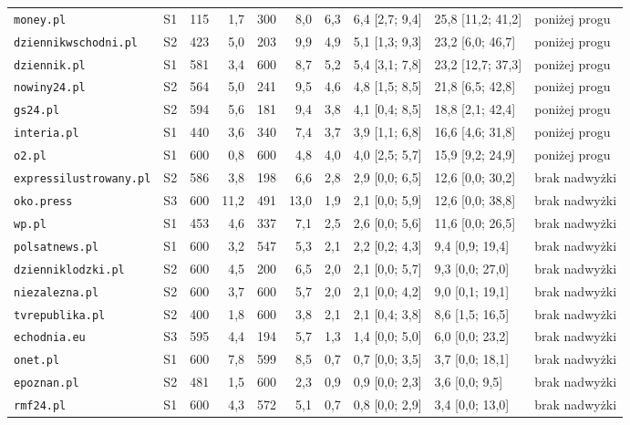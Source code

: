 \begin{landscape}
\begin{longtable}{@{}l c r r r r r l l l@{}}
\texttt{money.pl} & S1 & 115 & 1,7 & 300 & 8,0 & 6,3 & 6,4 [2,7; 9,4] & 25,8 [11,2; 41,2] & poniżej progu \\
\texttt{dziennikwschodni.pl} & S2 & 423 & 5,0 & 203 & 9,9 & 4,9 & 5,1 [1,3; 9,3] & 23,2 [6,0; 46,7] & poniżej progu \\
\texttt{dziennik.pl} & S1 & 581 & 3,4 & 600 & 8,7 & 5,2 & 5,4 [3,1; 7,8] & 23,2 [12,7; 37,3] & poniżej progu \\
\texttt{nowiny24.pl} & S2 & 564 & 5,0 & 241 & 9,5 & 4,6 & 4,8 [1,5; 8,5] & 21,8 [6,5; 42,8] & poniżej progu \\
\texttt{gs24.pl} & S2 & 594 & 5,6 & 181 & 9,4 & 3,8 & 4,1 [0,4; 8,5] & 18,8 [2,1; 42,4] & poniżej progu \\
\texttt{interia.pl} & S1 & 440 & 3,6 & 340 & 7,4 & 3,7 & 3,9 [1,1; 6,8] & 16,6 [4,6; 31,8] & poniżej progu \\
\texttt{o2.pl} & S1 & 600 & 0,8 & 600 & 4,8 & 4,0 & 4,0 [2,5; 5,7] & 15,9 [9,2; 24,9] & poniżej progu \\
\texttt{expressilustrowany.pl} & S2 & 586 & 3,8 & 198 & 6,6 & 2,8 & 2,9 [0,0; 6,5] & 12,6 [0,0; 30,2] & brak nadwyżki \\
\texttt{oko.press} & S3 & 600 & 11,2 & 491 & 13,0 & 1,9 & 2,1 [0,0; 5,9] & 12,6 [0,0; 38,8] & brak nadwyżki \\
\texttt{wp.pl} & S1 & 453 & 4,6 & 337 & 7,1 & 2,5 & 2,6 [0,0; 5,6] & 11,6 [0,0; 26,5] & brak nadwyżki \\
\texttt{polsatnews.pl} & S1 & 600 & 3,2 & 547 & 5,3 & 2,1 & 2,2 [0,2; 4,3] & 9,4 [0,9; 19,4] & brak nadwyżki \\
\texttt{dzienniklodzki.pl} & S2 & 600 & 4,5 & 200 & 6,5 & 2,0 & 2,1 [0,0; 5,7] & 9,3 [0,0; 27,0] & brak nadwyżki \\
\texttt{niezalezna.pl} & S2 & 600 & 3,7 & 600 & 5,7 & 2,0 & 2,1 [0,0; 4,2] & 9,0 [0,1; 19,1] & brak nadwyżki \\
\texttt{tvrepublika.pl} & S2 & 400 & 1,8 & 600 & 3,8 & 2,1 & 2,1 [0,4; 3,8] & 8,6 [1,5; 16,5] & brak nadwyżki \\
\texttt{echodnia.eu} & S3 & 595 & 4,4 & 194 & 5,7 & 1,3 & 1,4 [0,0; 5,0] & 6,0 [0,0; 23,2] & brak nadwyżki \\
\texttt{onet.pl} & S1 & 600 & 7,8 & 599 & 8,5 & 0,7 & 0,7 [0,0; 3,5] & 3,7 [0,0; 18,1] & brak nadwyżki \\
\texttt{epoznan.pl} & S2 & 481 & 1,5 & 600 & 2,3 & 0,9 & 0,9 [0,0; 2,3] & 3,6 [0,0; 9,5] & brak nadwyżki \\
\texttt{rmf24.pl} & S1 & 600 & 4,3 & 572 & 5,1 & 0,7 & 0,8 [0,0; 2,9] & 3,4 [0,0; 13,0] & brak nadwyżki \\

\end{longtable}
\end{landscape}
